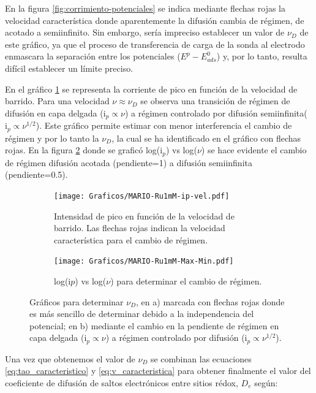 		 En la figura \ref{fig:corrimiento-potenciales} se indica mediante flechas rojas la velocidad característica donde aparentemente la difusión cambia de régimen, de acotado a semiinfinito. Sin embargo, sería impreciso establecer un valor de $\nu_{\scriptscriptstyle{D}}$ de este gráfico, ya que el proceso de transferencia de carga de la sonda al electrodo enmascara la separación entre los potenciales ($E^p-E^0_{ads}$) y, por lo tanto, resulta difícil establecer un límite preciso.
		   	 	 
         En el gráfico \ref{fig:ip-vel} se representa la corriente de pico en función de la velocidad de barrido. Para una velocidad $\nu \approx \nu_{\scriptscriptstyle{D}}$ se observa una transición de régimen de difusión en capa delgada ($\text{i}_{p} \propto \nu$) a régimen controlado por difusión semiinfinita($\text{i}_{p} \propto \nu^{1/2}$). Este gráfico permite estimar con menor interferencia el cambio de régimen y por lo tanto la $\nu_{\scriptscriptstyle{D}}$, la cual se ha identificado en el gráfico con flechas rojas. En la figura \ref{fig:logj-logv} donde se graficó log({i$_p$}) vs log({$\nu$}) se hace evidente el cambio de régimen difusión acotada (pendiente=1) a difusión semiinfinita (pendiente=0.5).

         	\begin{figure}[ht!]
			 	 \begin{subfigure}[t]{0.5\textwidth}
			 	 \texttt{[image: Graficos/MARIO-Ru1mM-ip-vel.pdf]}
				  \caption{Intensidad de pico  en función de la velocidad de barrido. Las flechas rojas indican la velocidad característica para el cambio de régimen.}
			 	 \label{fig:ip-vel}
		  	  	 \end{subfigure}	
			 	 \begin{subfigure}[t]{0.5\textwidth}
			  	 \texttt{[image: Graficos/MARIO-Ru1mM-Max-Min.pdf]}
			  	 \caption{log(i$p$) vs log($\nu$) para determinar el cambio de régimen.}
			 	 \label{fig:logj-logv}
		  		 \end{subfigure}
				  \caption[Cálculo de velocidad de barrido característica]{Gráficos para determinar $\nu_{\scriptscriptstyle{D}}$, en a) marcada con flechas rojas donde es más sencillo de determinar debido a la independencia del potencial; en b) mediante el cambio en la pendiente de  régimen en capa delgada ($\text{i}_{p} \propto \nu$) a régimen controlado por difusión ($\text{i}_{p} \propto \nu^{1/2}$).}
			 	 \label{fig:ip-vel2}
			 	 \end{figure}

		 \vspace*{3mm} Una vez que obtenemos el valor de  $\nu_{\scriptscriptstyle{D}}$ se combinan las ecuaciones \ref{eq:tao_caracteristico} y \ref{eq:v_caracteristica} para obtener finalmente el valor del coeficiente de difusión de saltos electrónicos entre sitios rédox,  $D_e$ según: 

